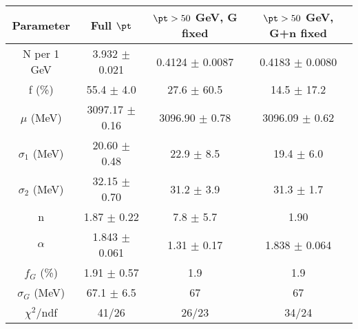 \begin{tabular}{c||c|c|c}
Parameter & Full $\pt$ & $\pt>50$ GeV, G fixed & $\pt>50$ GeV, G+n fixed \\
\hline
N per 1 GeV & 3.932 $\pm$ 0.021 & 0.4124 $\pm$ 0.0087 & 0.4183 $\pm$ 0.0080\\
f (\%) & 55.4 $\pm$ 4.0 & 27.6 $\pm$ 60.5 & 14.5 $\pm$ 17.2\\
$\mu$ (MeV) & 3097.17 $\pm$ 0.16 & 3096.90 $\pm$ 0.78 & 3096.09 $\pm$ 0.62\\
$\sigma_1$ (MeV) & 20.60 $\pm$ 0.48 & 22.9 $\pm$ 8.5 & 19.4 $\pm$ 6.0\\
$\sigma_2$ (MeV) & 32.15 $\pm$ 0.70 & 31.2 $\pm$ 3.9 & 31.3 $\pm$ 1.7\\
n & 1.87 $\pm$ 0.22 & 7.8 $\pm$ 5.7 & 1.90\\
$\alpha$ & 1.843 $\pm$ 0.061 & 1.31 $\pm$ 0.17 & 1.838 $\pm$ 0.064\\
$f_G$ (\%) & 1.91 $\pm$ 0.57 & 1.9 & 1.9\\
$\sigma_G$ (MeV) & 67.1 $\pm$ 6.5 & 67 & 67\\
\hline
$\chi^2$/ndf & 41/26 & 26/23 & 34/24\\
\end{tabular}
